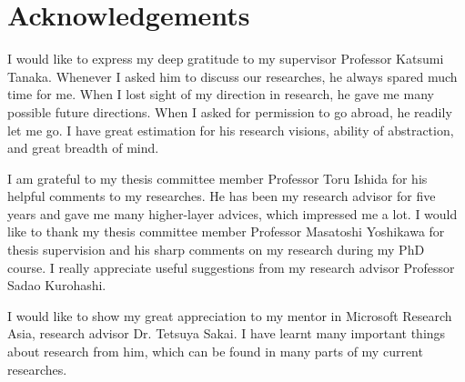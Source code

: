 \chapter*{Acknowledgements}

I would like to express my deep gratitude to my supervisor Professor Katsumi Tanaka.
Whenever I asked him to discuss our researches, he always spared much time for me.
When I lost sight of my direction in research, he gave me many possible future directions.
When I asked for permission to go abroad, he readily let me go.
I have great estimation for his research visions, ability of abstraction, and great breadth of mind.

I am grateful to my thesis committee member Professor Toru Ishida for his helpful comments to my researches.
He has been my research advisor for five years and gave me many higher-layer advices, which impressed me a lot.
I would like to thank my thesis committee member Professor Masatoshi Yoshikawa for thesis supervision and his sharp comments on my research during my PhD course.
I really appreciate useful suggestions from my research advisor Professor Sadao Kurohashi.

I would like to show my great appreciation to my mentor in Microsoft Research Asia, research advisor Dr. Tetsuya Sakai.
I have learnt many important things about research from him, which can be found in many parts of my current researches.
